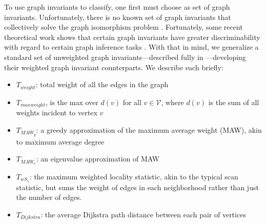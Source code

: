 \documentclass{article} %
\providecommand{\mc}[1]{\mathcal{#1}}
\begin{document}
To use graph invariants to classify, one first must choose as set of graph invariants.  Unfortunately, there is no known set of graph invariants that collectively solve the graph isomorphism problem \cite{Conte2004}.  Fortunately, some recent theoretical work shows that certain graph invariants have greater discriminability with regard to certain graph inference tasks \cite{Ruhkhin2011}. With that in mind, we generalize a standard set of unweighted graph invariants---described fully in \cite{CPP11}---developing their weighted graph invariant counterparts. We describe each briefly:
\begin{itemize}
	\item $T_{weight}$: total weight of all the edges in the graph
	\item $T_{maxweight}$, is the max over $d(v)$ for all $v \in \mc{V}$, where $d(v)$ is the sum of all weights incident to vertex $v$	
	\item $T_{MAW_g}$: a greedy approximation of the maximum average weight (MAW), akin to maximum average degree
	\item $T_{MAW_e}$: an eigenvalue approximation of MAW
	\item $T_{wS_1}$: the maximum weighted locality statistic, akin to the typical scan statistic, but sums the weight of edges in each neighborhood rather than just the number of edges.
	\item $T_{Dijkstra}$: the average Dijkstra path distance between each pair of vertices
\end{itemize}
\end{document}

